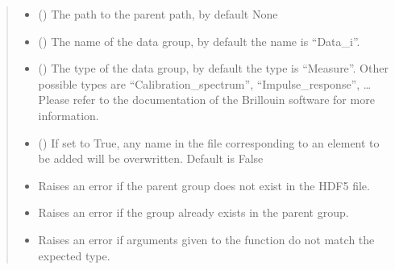 \documentclass[letterpaper,10pt,english]{sphinxmanual}
\begin{document}
\begin{fulllineitems}
\begin{fulllineitems}
\begin{quote}
\begin{description}
\begin{itemize}
\item {} 
\sphinxAtStartPar
{} (\sphinxstyleliteralemphasis{\sphinxupquote{, }}) \textendash{} The path to the parent path, by default None

\item {} 
\sphinxAtStartPar
{} (\sphinxstyleliteralemphasis{\sphinxupquote{, }}) \textendash{} The name of the data group, by default the name is “Data\_i”.

\item {} 
\sphinxAtStartPar
{} (\sphinxstyleliteralemphasis{\sphinxupquote{, }}) \textendash{} The type of the data group, by default the type is “Measure”. Other possible types are “Calibration\_spectrum”, “Impulse\_response”, … Please refer to the documentation of the Brillouin software for more information.

\item {} 
\sphinxAtStartPar
{} (\sphinxstyleliteralemphasis{\sphinxupquote{, }}) \textendash{} If set to True, any name in the file corresponding to an element to be added will be overwritten. Default is False

\end{itemize}

\begin{itemize}
\item {} 
\sphinxAtStartPar
{} \textendash{} Raises an error if the parent group does not exist in the HDF5 file.

\item {} 
\sphinxAtStartPar
{} \textendash{} Raises an error if the group already exists in the parent group.

\item {} 
\sphinxAtStartPar
{} \textendash{} Raises an error if arguments given to the function do not match the expected type.


\end{itemize}
\end{description}
\end{quote}
\end{fulllineitems}
\end{fulllineitems}
\end{document}
